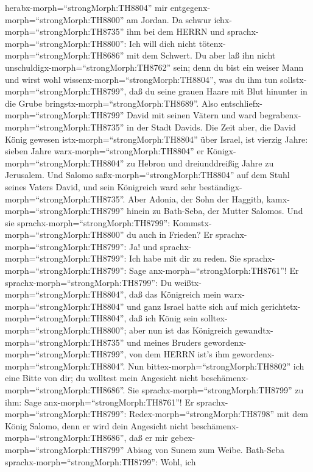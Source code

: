 herabx-morph=``strongMorph:TH8804'' mir
entgegenx-morph=``strongMorph:TH8800'' am Jordan. Da schwur
ichx-morph=``strongMorph:TH8735'' ihm bei dem HERRN und
sprachx-morph=``strongMorph:TH8800'': Ich will dich nicht
tötenx-morph=``strongMorph:TH8686'' mit dem Schwert.  Du
aber laß ihn nicht unschuldigx-morph=``strongMorph:TH8762'' sein; denn
du bist ein weiser Mann und wirst wohl
wissenx-morph=``strongMorph:TH8804'', was du ihm tun
sollstx-morph=``strongMorph:TH8799'', daß du seine grauen Haare mit Blut
hinunter in die Grube bringstx-morph=``strongMorph:TH8689''.
 Also entschliefx-morph=``strongMorph:TH8799'' David mit
seinen Vätern und ward begrabenx-morph=``strongMorph:TH8735'' in der
Stadt Davids.  Die Zeit aber, die David König gewesen
istx-morph=``strongMorph:TH8804'' über Israel, ist vierzig Jahre: sieben
Jahre warx-morph=``strongMorph:TH8804'' er
Königx-morph=``strongMorph:TH8804'' zu Hebron und dreiunddreißig Jahre
zu Jerusalem.  Und Salomo saßx-morph=``strongMorph:TH8804''
auf dem Stuhl seines Vaters David, und sein Königreich ward sehr
beständigx-morph=``strongMorph:TH8735''.  Aber Adonia, der
Sohn der Haggith, kamx-morph=``strongMorph:TH8799'' hinein zu Bath-Seba,
der Mutter Salomos. Und sie sprachx-morph=``strongMorph:TH8799'':
Kommstx-morph=``strongMorph:TH8800'' du auch in Frieden? Er
sprachx-morph=``strongMorph:TH8799'': Ja!  und
sprachx-morph=``strongMorph:TH8799'': Ich habe mit dir zu reden. Sie
sprachx-morph=``strongMorph:TH8799'': Sage
anx-morph=``strongMorph:TH8761''!  Er
sprachx-morph=``strongMorph:TH8799'': Du
weißtx-morph=``strongMorph:TH8804'', daß das Königreich mein
warx-morph=``strongMorph:TH8804'' und ganz Israel hatte sich auf mich
gerichtetx-morph=``strongMorph:TH8804'', daß ich König sein
solltex-morph=``strongMorph:TH8800''; aber nun ist das Königreich
gewandtx-morph=``strongMorph:TH8735'' und meines Bruders
gewordenx-morph=``strongMorph:TH8799'', von dem HERRN ist's ihm
gewordenx-morph=``strongMorph:TH8804''.  Nun
bittex-morph=``strongMorph:TH8802'' ich eine Bitte von dir; du wolltest
mein Angesicht nicht beschämenx-morph=``strongMorph:TH8686''. Sie
sprachx-morph=``strongMorph:TH8799'' zu ihm: Sage
anx-morph=``strongMorph:TH8761''!  Er
sprachx-morph=``strongMorph:TH8799'': Redex-morph=``strongMorph:TH8798''
mit dem König Salomo, denn er wird dein Angesicht nicht
beschämenx-morph=``strongMorph:TH8686'', daß er mir
gebex-morph=``strongMorph:TH8799'' Abisag von Sunem zum Weibe.
 Bath-Seba sprachx-morph=``strongMorph:TH8799'': Wohl, ich

